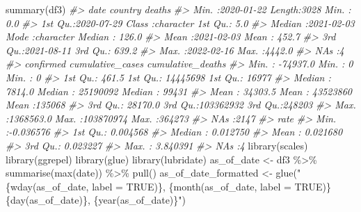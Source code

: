 \documentclass[
]{book}
\newenvironment{Shaded}{\begin{snugshade}}{\end{snugshade}}
\newcommand{\CommentTok}[1]{\textcolor[rgb]{0.56,0.35,0.01}{\textit{#1}}}
\newcommand{\FunctionTok}[1]{\textcolor[rgb]{0.00,0.00,0.00}{#1}}
\newcommand{\NormalTok}[1]{#1}
\newcommand{\OtherTok}[1]{\textcolor[rgb]{0.56,0.35,0.01}{#1}}
\newcommand{\SpecialCharTok}[1]{\textcolor[rgb]{0.00,0.00,0.00}{#1}}
\newcommand{\StringTok}[1]{\textcolor[rgb]{0.31,0.60,0.02}{#1}}
\begin{document}
\begin{Shaded}
\begin{Highlighting}[]

\FunctionTok{summary}\NormalTok{(df3)}
\CommentTok{\#\textgreater{}       date              country              deaths      }
\CommentTok{\#\textgreater{}  Min.   :2020{-}01{-}22   Length:3028        Min.   :   0.0  }
\CommentTok{\#\textgreater{}  1st Qu.:2020{-}07{-}29   Class :character   1st Qu.:   5.0  }
\CommentTok{\#\textgreater{}  Median :2021{-}02{-}03   Mode  :character   Median : 126.0  }
\CommentTok{\#\textgreater{}  Mean   :2021{-}02{-}03                      Mean   : 452.7  }
\CommentTok{\#\textgreater{}  3rd Qu.:2021{-}08{-}11                      3rd Qu.: 639.2  }
\CommentTok{\#\textgreater{}  Max.   :2022{-}02{-}16                      Max.   :4442.0  }
\CommentTok{\#\textgreater{}                                          NA\textquotesingle{}s   :4       }
\CommentTok{\#\textgreater{}    confirmed         cumulative\_cases    cumulative\_deaths}
\CommentTok{\#\textgreater{}  Min.   : {-}74937.0   Min.   :        0   Min.   :     0   }
\CommentTok{\#\textgreater{}  1st Qu.:    461.5   1st Qu.: 14445698   1st Qu.: 16977   }
\CommentTok{\#\textgreater{}  Median :   7814.0   Median : 25190092   Median : 99431   }
\CommentTok{\#\textgreater{}  Mean   :  34303.5   Mean   : 43523860   Mean   :135068   }
\CommentTok{\#\textgreater{}  3rd Qu.:  28170.0   3rd Qu.:103362932   3rd Qu.:248203   }
\CommentTok{\#\textgreater{}  Max.   :1368563.0   Max.   :103870974   Max.   :364273   }
\CommentTok{\#\textgreater{}                                          NA\textquotesingle{}s   :2147     }
\CommentTok{\#\textgreater{}       rate          }
\CommentTok{\#\textgreater{}  Min.   :{-}0.036576  }
\CommentTok{\#\textgreater{}  1st Qu.: 0.004568  }
\CommentTok{\#\textgreater{}  Median : 0.012750  }
\CommentTok{\#\textgreater{}  Mean   : 0.021680  }
\CommentTok{\#\textgreater{}  3rd Qu.: 0.023227  }
\CommentTok{\#\textgreater{}  Max.   : 3.840391  }
\CommentTok{\#\textgreater{}  NA\textquotesingle{}s   :4}
\FunctionTok{library}\NormalTok{(scales)}
\FunctionTok{library}\NormalTok{(ggrepel)}
\FunctionTok{library}\NormalTok{(glue)}
\FunctionTok{library}\NormalTok{(lubridate)}
\NormalTok{as\_of\_date }\OtherTok{\textless{}{-}}\NormalTok{ df3 }\SpecialCharTok{\%\textgreater{}\%} 
  \FunctionTok{summarise}\NormalTok{(}\FunctionTok{max}\NormalTok{(date)) }\SpecialCharTok{\%\textgreater{}\%} 
  \FunctionTok{pull}\NormalTok{()}
\NormalTok{as\_of\_date\_formatted }\OtherTok{\textless{}{-}} \FunctionTok{glue}\NormalTok{(}\StringTok{"\{wday(as\_of\_date, label = TRUE)\}, \{month(as\_of\_date, label = TRUE)\} \{day(as\_of\_date)\}, \{year(as\_of\_date)\}"}\NormalTok{)}


\end{Highlighting}
\end{Shaded}
\end{document}

